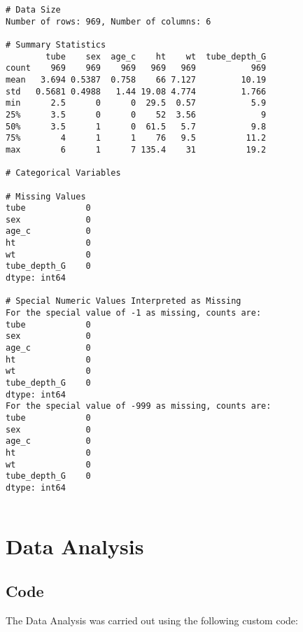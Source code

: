\documentclass[11pt]{article}
\begin{document}
\begin{Verbatim}[tabsize=4]
# Data Size
Number of rows: 969, Number of columns: 6

# Summary Statistics
        tube    sex  age_c    ht    wt  tube_depth_G
count    969    969    969   969   969           969
mean   3.694 0.5387  0.758    66 7.127         10.19
std   0.5681 0.4988   1.44 19.08 4.774         1.766
min      2.5      0      0  29.5  0.57           5.9
25%      3.5      0      0    52  3.56             9
50%      3.5      1      0  61.5   5.7           9.8
75%        4      1      1    76   9.5          11.2
max        6      1      7 135.4    31          19.2

# Categorical Variables

# Missing Values
tube            0
sex             0
age_c           0
ht              0
wt              0
tube_depth_G    0
dtype: int64

# Special Numeric Values Interpreted as Missing
For the special value of -1 as missing, counts are:
tube            0
sex             0
age_c           0
ht              0
wt              0
tube_depth_G    0
dtype: int64
For the special value of -999 as missing, counts are:
tube            0
sex             0
age_c           0
ht              0
wt              0
tube_depth_G    0
dtype: int64


\end{Verbatim}

\section{Data Analysis}
\subsection{{Code}}
The Data Analysis was carried out using the following custom code:
\end{document}
